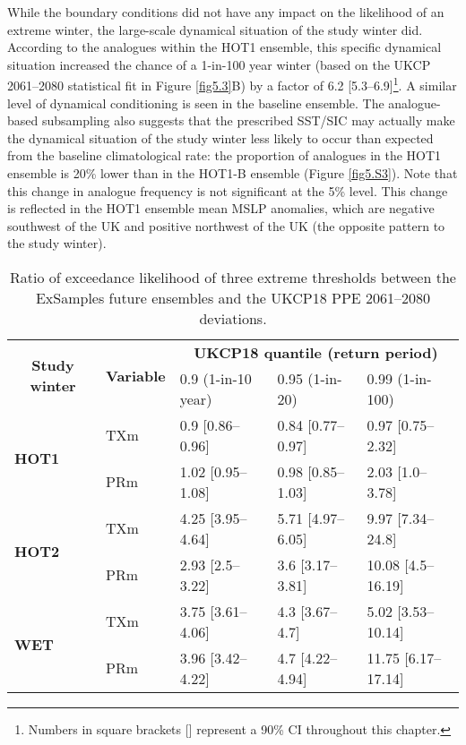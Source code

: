       While the boundary conditions did not have any impact on the likelihood of an extreme winter, the large-scale dynamical situation of the study winter did. According to the analogues within the HOT1 ensemble, this specific dynamical situation increased the chance of a 1-in-100 year winter (based on the UKCP 2061--2080 statistical fit in Figure \ref{fig5.3}B) by a factor of 6.2 [5.3--6.9]\footnote{Numbers in square brackets [] represent a 90\% CI throughout this chapter.}. A similar level of dynamical conditioning is seen in the baseline ensemble. The analogue-based subsampling also suggests that the prescribed SST/SIC may actually make the dynamical situation of the study winter less likely to occur than expected from the baseline climatological rate: the proportion of analogues in the HOT1 ensemble is 20\% lower than in the HOT1-B ensemble (Figure \ref{fig5.S3}). Note that this change in analogue frequency is not significant at the 5\% level. This change is reflected in the HOT1 ensemble mean MSLP anomalies, which are negative southwest of the UK and positive northwest of the UK (the opposite pattern to the study winter).

      \begin{table}[h]
        \centering
        \footnotesize
        \begin{tabular}{lllll}
          \toprule
          \multicolumn{1}{c}{\multirow{2}{*}{\textbf{Study winter}}}&\multicolumn{1}{c}{\multirow{2}{*}{\textbf{Variable}}}&\multicolumn{3}{c}{\textbf{UKCP18 quantile (return period)}}\\\cmidrule(lr){3-5}
          \multicolumn{1}{c}{}&\multicolumn{1}{c}{}&\multicolumn{1}{l}{0.9 (1-in-10 year)}&\multicolumn{1}{l}{0.95 (1-in-20)}&0.99 (1-in-100)\\\midrule
          \multirow{2}{*}{\textbf{HOT1}}&TXm&\multicolumn{1}{l}{0.9 {[}0.86--0.96{]}}&\multicolumn{1}{l}{0.84 {[}0.77--0.97{]}}&0.97 {[}0.75--2.32{]}\\
          &PRm&\multicolumn{1}{l}{1.02 {[}0.95--1.08{]}}&\multicolumn{1}{l}{0.98 {[}0.85--1.03{]}}&2.03 {[}1.0--3.78{]}\\\midrule
          \multirow{2}{*}{\textbf{HOT2}}&TXm&\multicolumn{1}{l}{4.25 {[}3.95--4.64{]}}&\multicolumn{1}{l}{5.71 {[}4.97--6.05{]}}&9.97 {[}7.34--24.8{]}\\
          &PRm&\multicolumn{1}{l}{2.93 {[}2.5--3.22{]}}&\multicolumn{1}{l}{3.6 {[}3.17--3.81{]}}&10.08 {[}4.5--16.19{]}\\\midrule
          \multirow{2}{*}{\textbf{WET}}&TXm&\multicolumn{1}{l}{3.75 {[}3.61--4.06{]}}&\multicolumn{1}{l}{4.3 {[}3.67--4.7{]}}&5.02 {[}3.53--10.14{]}\\
          &PRm&\multicolumn{1}{l}{3.96 {[}3.42--4.22{]}}&\multicolumn{1}{l}{4.7 {[}4.22--4.94{]}}&11.75 {[}6.17--17.14{]}\\\bottomrule
          \end{tabular}
        \caption{Ratio of exceedance likelihood of three extreme thresholds between the ExSamples future ensembles and the UKCP18 PPE 2061--2080 deviations.}
      \end{table}

